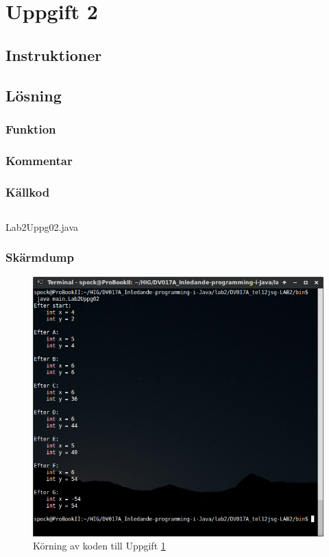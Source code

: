 \section{Uppgift 2}\label{sec:uppg02}

\subsection{Instruktioner}


\subsection{Lösning}
\subsubsection{Funktion}

\subsubsection{Kommentar}


\subsubsection{Källkod}
\inputminted[linenos]{java}{src/Lab2Uppg02.java}
\caption{Lab2Uppg02.java}
\label{src:uppg02}


\subsubsection{Skärmdump}
\begin{figure}[htbp]
    \centering
        \includegraphics[width=\linewidth]{img/02.png}
    \caption{Körning av koden till Uppgift \ref{sec:uppg02}}
    \label{fig:uppg02-screenshot}
\end{figure}


